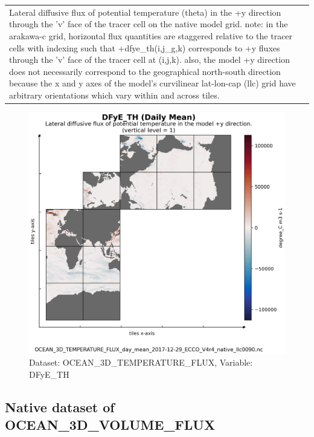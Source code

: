 \begin{longtable}{|m{}|m{}|m{}|m{}|}
\rowcolor{lightgray} \multicolumn{4}{|c|}{\textbf{Comments}} \\ \hline
\multicolumn{4}{|p{1\textwidth}|}{\footnotesize{{Lateral diffusive flux of potential temperature (theta) in the +y direction through the 'v' face of the tracer cell on the native model grid. note: in the arakawa-c grid, horizontal flux quantities are staggered relative to the tracer cells with indexing such that +dfye\_th(i,j\_g,k) corresponds to +y fluxes through the 'v' face of the tracer cell at (i,j,k). also, the model +y direction does not necessarily correspond to the geographical north-south direction because the x and y axes of the model's curvilinear lat-lon-cap (llc) grid have arbitrary orientations which vary within and across tiles.}}} \\ \hline
\end{longtable}

\begin{figure}[H]
\centering
\includegraphics[scale=0.55]{../images/plots/v4r4/native_plots/Ocean_Three-Dimensional_Potential_Temperature_Fluxes/DFyE_TH.png}
\caption{Dataset: OCEAN\_3D\_TEMPERATURE\_FLUX, Variable: DFyE\_TH}
\label{tab:table-OCEAN_3D_TEMPERATURE_FLUX_DFyE_TH-Plot}
\end{figure}
\newpage
\subsection{Native dataset of OCEAN\_3D\_VOLUME\_FLUX}
\newp
